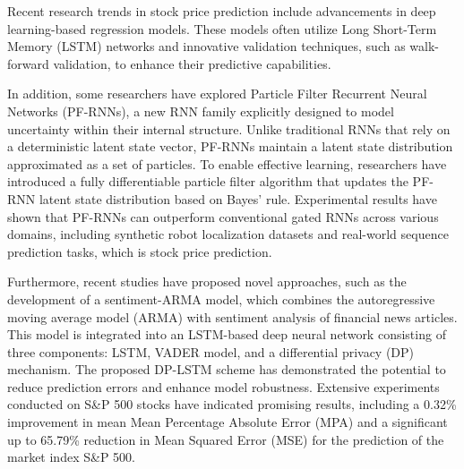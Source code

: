 
Recent research trends in stock price prediction include advancements in deep learning-based regression models. \cite{li2019dp}
These models often utilize Long Short-Term Memory (LSTM) networks and innovative validation techniques, such as walk-forward validation, to enhance their predictive capabilities.

In addition, some researchers have explored Particle Filter Recurrent Neural Networks (PF-RNNs), a new RNN family explicitly designed to model uncertainty within their internal structure. \cite{ma2020particle}
Unlike traditional RNNs that rely on a deterministic latent state vector, PF-RNNs maintain a latent state distribution approximated as a set of particles. 
To enable effective learning, researchers have introduced a fully differentiable particle filter algorithm that updates the PF-RNN latent state distribution based on Bayes' rule. 
Experimental results have shown that PF-RNNs can outperform conventional gated RNNs across various domains, 
including synthetic robot localization datasets and real-world sequence prediction tasks, which is stock price prediction.

Furthermore, recent studies have proposed novel approaches, such as the development of a sentiment-ARMA model, which combines the autoregressive moving average model (ARMA) with sentiment analysis of financial news articles. \cite{mehtab2021stock}
This model is integrated into an LSTM-based deep neural network consisting of three components: LSTM, VADER model, and a differential privacy (DP) mechanism. 
The proposed DP-LSTM scheme has demonstrated the potential to reduce prediction errors and enhance model robustness. Extensive experiments conducted on S\&P 500 stocks have indicated promising results, 
including a 0.32\% improvement in mean Mean Percentage Absolute Error (MPA) 
and a significant up to 65.79\% reduction in Mean Squared Error (MSE) for the prediction of the market index S\&P 500.

